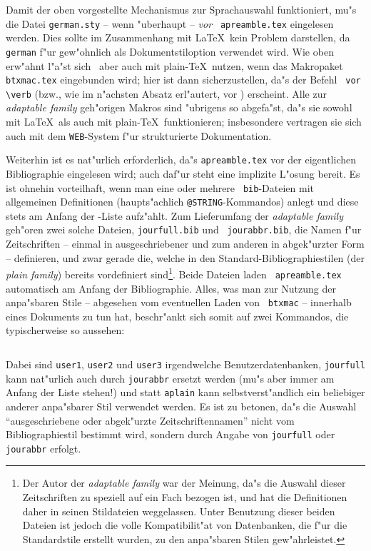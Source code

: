 Damit der oben vorgestellte Mechanismus zur Sprachauswahl funktioniert, mu"s
die Datei {\tt german.sty} -- wenn "uberhaupt -- {\em vor\/} {\tt
apreamble.tex} eingelesen werden. Dies sollte im Zusammenhang mit \LaTeX\
kein Problem darstellen, da \verb|german| f"ur gew"ohnlich als
Dokumentstiloption verwendet wird. Wie oben erw"ahnt l"a"st sich \BibTeX\
aber auch mit plain-\TeX\ nutzen, wenn das Makropaket {\tt btxmac.tex}
eingebunden wird; hier ist dann sicherzustellen, da"s der Befehl
\verb| vor \verb| (bzw., wie im n"achsten
Absatz erl"autert, vor \verb||) erscheint. Alle zur {\em
adaptable family\/} geh"origen Makros sind "ubrigens so abgefa"st, da"s sie
sowohl mit \LaTeX\ als auch mit plain-\TeX\ funktionieren; insbesondere
vertragen sie sich auch mit dem {\tt WEB}-System f"ur strukturierte
Dokumentation.

Weiterhin ist es nat"urlich erforderlich, da"s {\tt apreamble.tex} vor der
eigentlichen Bibliographie eingelesen wird; auch daf"ur steht eine implizite
L"osung bereit. Es ist ohnehin vorteilhaft, wenn man eine oder mehrere {\tt
bib}-Dateien mit allgemeinen Definitionen (haupts"achlich
\verb|@STRING|-Kommandos) anlegt und diese stets am Anfang der
\verb||-Liste aufz"ahlt. Zum Lieferumfang der {\em adaptable
family\/} geh"oren zwei solche Dateien, {\tt jourfull.bib} und {\tt
jourabbr.bib}, die Namen f"ur Zeitschriften -- einmal in ausgeschriebener
und zum anderen in abgek"urzter Form -- definieren, und zwar gerade die,
welche in den Standard-Bibliographiestilen (der {\em plain family\/})
bereits vordefiniert sind\footnote{Der Autor der {\em adaptable family\/}
war der Meinung, da"s die Auswahl dieser Zeitschriften zu speziell auf ein
Fach bezogen ist, und hat die Definitionen daher in seinen Stildateien
weggelassen. Unter Benutzung dieser beiden Dateien ist jedoch die volle
Kompatibilit"at von Datenbanken, die f"ur die Standardstile erstellt wurden,
zu den anpa"sbaren Stilen gew"ahrleistet.}. Beide Dateien laden {\tt
apreamble.tex} automatisch am Anfang der Bibliographie. Alles, was man zur
Nutzung der anpa"sbaren Stile -- abgesehen vom eventuellen Laden von {\tt
btxmac} -- innerhalb eines Dokuments zu tun hat, beschr"ankt sich somit auf
zwei Kommandos, die typischerweise so aussehen:
\begin{verbatim}

\end{verbatim}
Dabei sind \verb|user1|, \verb|user2| und \verb|user3| irgendwelche
Benutzerdatenbanken, \verb|jourfull| kann nat"urlich auch durch
\verb|jourabbr| ersetzt werden (mu"s aber immer am Anfang der Liste stehen!)
und statt \verb|aplain| kann selbstverst"andlich ein beliebiger anderer
anpa"sbarer Stil verwendet werden. Es ist zu betonen, da"s die Auswahl
"`ausgeschriebene oder abgek"urzte Zeitschriftennamen"' nicht vom
Bibliographiestil bestimmt wird, sondern durch Angabe von \verb|jourfull|
oder \verb|jourabbr| erfolgt.

